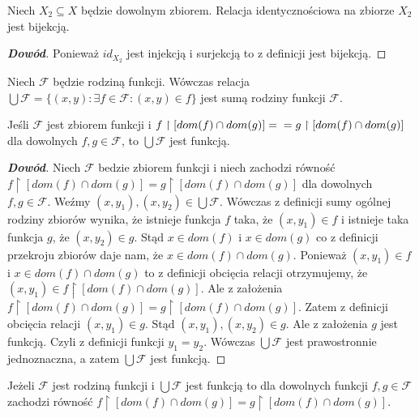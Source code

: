 \begin{theorem}
Niech $X_{2}\subseteq X$ będzie dowolnym zbiorem. Relacja identycznościowa na zbiorze $X_{2}$ jest bijekcją.
\end{theorem}
\begin{proof}[\textbf{Dowód}]
Ponieważ $id_{X_{2}}$ jest injekcją i surjekcją to z definicji jest bijekcją.
\end{proof}
\begin{definition}
Niech $\mathcal{F}$ będzie rodziną funkcji.
Wówczas relacja $\bigcup\mathcal{F}=\{(x,y): \exists f\in\mathcal{F}:(x,y)\in f\}$ jest sumą rodziny funkcji $\mathcal{F}$.
\end{definition}
\begin{theorem}
Jeśli $\mathcal{F}$ jest zbiorem funkcji i $f\upharpoonright[dom(f)\cap dom(g)]=\\=g\upharpoonright[dom(f)\cap dom(g)]$ dla dowolnych $f,g\in\mathcal{F}$, to $\bigcup\mathcal{F}$ jest funkcją.
\end{theorem}
\begin{proof}[\textbf{Dowód}]
Niech $\mathcal{F}$ bedzie zbiorem funkcji i niech zachodzi równość $f\upharpoonright[dom(f)\cap dom(g)]=g\upharpoonright[dom(f)\cap dom(g)]$ dla dowolnych $f,g\in\mathcal{F}$. Weźmy $(x,y_{1}),(x,y_{2})\in\bigcup\mathcal{F}$. Wówczas z definicji sumy ogólnej rodziny zbiorów wynika, że istnieje funkcja $f$ taka, że $(x,y_{1})\in f$ i istnieje taka funkcja $g$, że $(x,y_{2})\in g$. Stąd $x\in dom(f)$ i $x\in dom(g)$ co z definicji przekroju zbiorów daje nam, że $x\in dom(f)\cap dom(g)$. Ponieważ $(x,y_{1})\in f$ i $x\in dom(f)\cap dom(g)$ to z definicji obcięcia relacji otrzymujemy, że $(x,y_{1})\in f\upharpoonright[dom(f)\cap dom(g)]$. Ale z założenia $f\upharpoonright[dom(f)\cap dom(g)]=g\upharpoonright[dom(f)\cap dom(g)]$. Zatem z definicji obcięcia relacji $(x,y_{1})\in g$. Stąd $(x,y_{1}),(x,y_{2})\in g$. Ale z założenia $g$ jest funkcją. Czyli z definicji funkcji $y_{1}=y_{2}$. Wówczas $\bigcup\mathcal{F}$ jest prawostronnie jednoznaczna, a zatem $\bigcup\mathcal{F}$ jest funkcją.
\end{proof}
\begin{theorem}
Jeżeli $\mathcal{F}$ jest rodziną funkcji i $\bigcup\mathcal{F}$ jest funkcją to dla dowolnych funkcji $f,g\in\mathcal{F}$ zachodzi równość $f\upharpoonright[dom(f)\cap dom(g)]=g\upharpoonright[dom(f)\cap dom(g)]$.
\end{theorem}
